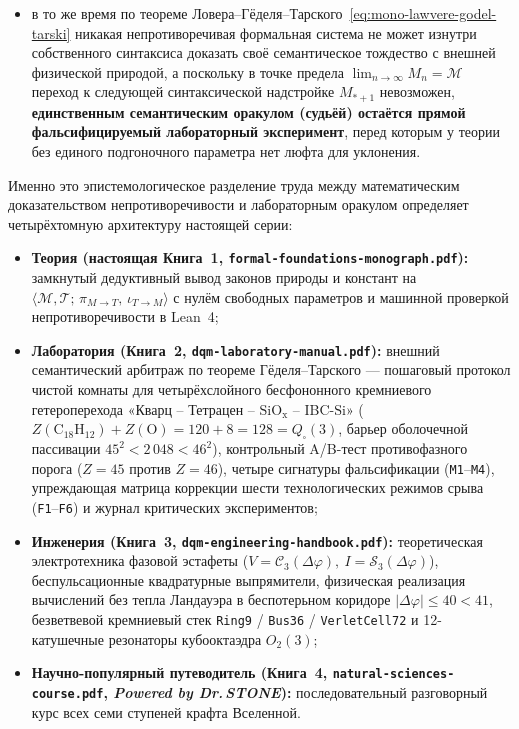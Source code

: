\begin{enumerate}[label=\textbf{\arabic*.},leftmargin=*]
\begin{itemize}[noitemsep]
  \item в то же время по теореме Ловера--Гёделя--Тарского~\eqref{eq:mono-lawvere-godel-tarski} никакая непротиворечивая формальная система не может изнутри собственного синтаксиса доказать своё семантическое тождество с внешней физической природой, а поскольку в точке предела $\lim_{n\to\infty} M_n = \mathcal{M}$ переход к следующей синтаксической надстройке $M_{*+1}$ невозможен, \textbf{единственным семантическим оракулом (судьёй) остаётся прямой фальсифицируемый лабораторный эксперимент}, перед которым у теории без единого подгоночного параметра нет люфта для уклонения.
  \end{itemize}
\end{enumerate}

Именно это эпистемологическое разделение труда между математическим доказательством непротиворечивости и лабораторным оракулом определяет четырёхтомную архитектуру настоящей серии:
\begin{itemize}[leftmargin=*]
\item \textbf{Теория (настоящая Книга~1, \texttt{formal-foundations-monograph.pdf}):} замкнутый дедуктивный вывод законов природы и констант на $\langle\mathcal{M},\mathcal{T};\,\pi_{M\to T},\,\iota_{T\to M}\rangle$ с нулём свободных параметров и машинной проверкой непротиворечивости в Lean~4;
\item \textbf{Лаборатория (Книга~2, \texttt{dqm-laboratory-manual.pdf}):} внешний семантический арбитраж по теореме Гёделя--Тарского --- пошаговый протокол чистой комнаты для четырёхслойного бесфононного кремниевого гетероперехода «Кварц -- Тетрацен -- $\mathrm{SiO_x}$ -- IBC-$\mathrm{Si}$» ($Z(\mathrm{C_{18}H_{12}}) + Z(\mathrm{O}) = 120 + 8 = 128 = Q_\square(3)$, барьер оболочечной пассивации $45^2 < 2\,048 < 46^2$), контрольный A/B-тест противофазного порога ($Z=45$ против $Z=46$), четыре сигнатуры фальсификации (\texttt{M1}--\texttt{M4}), упреждающая матрица коррекции шести технологических режимов срыва (\texttt{F1}--\texttt{F6}) и журнал критических экспериментов;
\item \textbf{Инженерия (Книга~3, \texttt{dqm-engineering-handbook.pdf}):} теоретическая электротехника фазовой эстафеты ($V = \mathcal{C}_3(\Delta\varphi),\ I = \mathcal{S}_3(\Delta\varphi)$), беспульсационные квадратурные выпрямители, физическая реализация вычислений без тепла Ландауэра в беспотерьном коридоре $|\Delta\varphi|\le 40 < 41$, безветвевой кремниевый стек \texttt{Ring9} / \texttt{Bus36} / \texttt{VerletCell72} и 12-катушечные резонаторы кубооктаэдра $O_2(3)$;
\item \textbf{Научно-популярный путеводитель (Книга~4, \texttt{natural-sciences-course.pdf}, \emph{Powered by Dr.\,STONE}):} последовательный разговорный курс всех семи ступеней крафта Вселенной.
\end{itemize}
